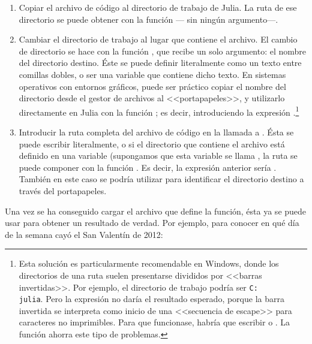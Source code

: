 ﻿\documentclass[spanish]{article}
\begin{document}
\begin{enumerate}
  \item Copiar el archivo de código 
  al directorio de trabajo de Julia. La ruta de ese directorio se puede
  obtener con la función  --- sin ningún argumento---.
  \item Cambiar el directorio de trabajo al lugar que contiene el archivo.
  El cambio de directorio se hace con la función , que recibe
  un solo argumento: el nombre del directorio destino. Éste se puede definir
  literalmente como un texto entre comillas dobles, o ser una variable
  que contiene dicho texto. En sistemas operativos con entornos gráficos,
  puede ser práctico copiar el nombre del directorio desde el gestor de
  archivos al <<portapapeles>>, y utilizarlo directamente en Julia
  con la función ; es decir, introduciendo la
  expresión .\footnote{%
  Esta solución es particularmente recomendable en Windows, donde los
  directorios de una ruta suelen presentarse divididos por
  <<barras invertidas>>. Por ejemplo, el directorio de trabajo podría ser
  \texttt{C:\\julia}. Pero la expresión 
  no daría el resultado esperado, porque la barra invertida se interpreta
  como inicio de una <<secuencia de escape>> para caracteres no imprimibles.
  Para que funcionase, habría que escribir  o
  . La función  ahorra
  este tipo de problemas.}%
  \item Introducir la ruta completa del archivo de código
  en la llamada a . Ésta se puede escribir literalmente,
  o si el directorio que contiene el archivo está definido en una variable
  (supongamos que esta variable se llama , la ruta
  se puede componer con la función . Es decir, la expresión
  anterior sería .
  También en este caso se podría utilizar  para
  identificar el directorio destino a través del portapapeles.
\end{enumerate}

Una vez se ha conseguido cargar el archivo que define la función,
ésta ya se puede usar para obtener un resultado de verdad. Por ejemplo,
para conocer en qué día de la semana cayó el San Valentín de 2012:
\end{document}
